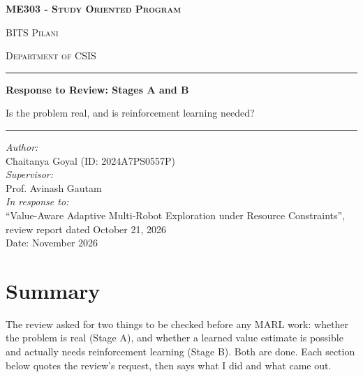\documentclass[11pt,a4paper]{article}
\begin{document}
\begin{titlepage}
\centering
\vspace*{2.2cm}
{\Large\textbf{ME303 - \textsc{Study Oriented Program}}\par}
\vspace{0.9cm}
{\Large BITS \textsc{Pilani}\par}
\vspace{0.3cm}
{\large \textsc{Department of CSIS}\par}
\vspace{1.4cm}
\rule{\linewidth}{0.8pt}\par\vspace{0.3cm}
{\huge\bfseries Response to Review: Stages A and B\par}
\vspace{0.3cm}
{\Large Is the problem real, and is reinforcement learning needed?\par}
\vspace{0.2cm}
\rule{\linewidth}{0.8pt}\par
\vspace{1.8cm}
\begin{flushleft}
\textit{Author:}\\
Chaitanya Goyal (ID: 2024A7PS0557P)\\[0.8em]
\textit{Supervisor:}\\
Prof. Avinash Gautam\\[0.8em]
\textit{In response to:}\\
``Value-Aware Adaptive Multi-Robot Exploration under Resource Constraints'', review report dated October 21, 2026\\
\vspace{2.4cm}
Date: November 2026
\end{flushleft}
\end{titlepage}

\section{Summary}

The review asked for two things to be checked before any MARL work: whether the problem is real (Stage A), and whether a learned value estimate is possible and actually needs reinforcement learning (Stage B). Both are done. Each section below quotes the review's request, then says what I did and what came out.
\end{document}
